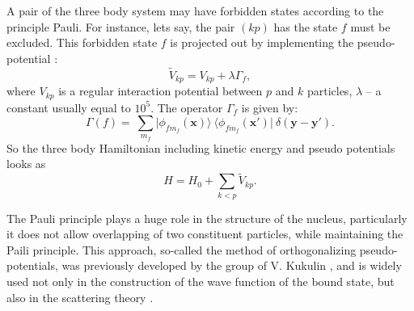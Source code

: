 \documentclass[
12pt, %
oneside, %
english, %
onehalfspacing, %
onehalfspacing, %
headsepline, %
]{MastersDoctoralThesis} %
\begin{document}
A pair of the three body system may have forbidden states according to the principle Pauli. 
For instance, lets say, the pair $(kp)$ has the state $f$ must be excluded.  
This forbidden state $f$ is projected out by implementing the pseudo-potential \cite{kukulin1978orthogonal}:
\begin{equation}
\label{pseudopot}
\widetilde{V}_{kp}=V_{kp}+\lambda \Gamma_f,
\end{equation}
where $V_{kp}$ is  a regular interaction potential between $p$ and $k$ particles,  $\lambda$ -- a constant usually equal to $10^5$. The operator $\Gamma_f$ is given by:
\begin{equation}
\label{projector}
\Gamma(f)=~
\sum\limits_{m_f}\vert \phi_{fm_f} ({\mathbf x})\rangle~ 
 \langle  \phi_{fm_f} ({\mathbf x'}) \vert ~
 \delta({\mathbf y - \mathbf y'}).
\end{equation}
So the three body Hamiltonian including kinetic energy and pseudo potentials looks as
\begin{equation}
\label{pseudohamiltonian}
H=H_0+\sum_{k < p} \widetilde{V }_{kp}.
\end{equation}

The Pauli principle plays a huge role in the structure of the nucleus, particularly it does not allow overlapping of two constituent particles, while maintaining the Paili principle.
This approach, so-called the method of orthogonalizing pseudo-potentials, was previously developed by the group of V. Kukulin \cite{kukulin1978orthogonal}, and is widely used not only in the construction of the wave function of the bound state, but also in the scattering theory \cite{blokhintsev1993determination, tursunov2016theoretical}.
\end{document}
